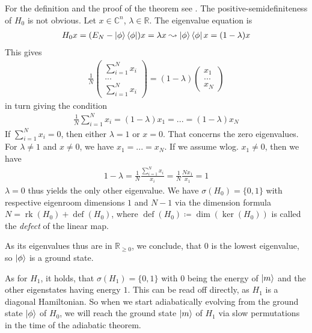 \documentclass[10pt]{amsart}
\theoremstyle{definition}
\theoremstyle{remark}
\DeclareMathOperator{\rk}{rk}
\DeclareMathOperator{\defect}{def}
\begin{document}
    For the definition and the proof of the theorem see \cite[pp. 86-91]{Lyche}. The positive-semidefiniteness of \(H_0\) is not obvious. Let \(x \in \mathbb{C}^n\), \(\lambda \in \mathbb{R}\). The eigenvalue equation is
    \begin{align}
        H_0x = (E_N-\ket{\phi}\bra{\phi})x = \lambda x \leadsto \ket{\phi}\bra{\phi}x = (1-\lambda)x
    \end{align}
    This gives
    \begin{align}
        \frac{1}{N} \begin{pmatrix}
            \sum_{i=1}^N x_i\\
            ...\\
            \sum_{i=1}^N x_i
        \end{pmatrix} = (1-\lambda) \begin{pmatrix}
            x_1\\
            ...\\
            x_N
        \end{pmatrix}
    \end{align}
    in turn giving the condition
    \begin{align}
        \frac{1}{N} \sum_{i=1}^N x_i = (1-\lambda) x_1 = ... = (1-\lambda) x_N
    \end{align}
    If \(\sum_{i=1}^N x_i = 0\), then either \(\lambda = 1\) or \(x = 0\). That concerns the zero eigenvalues. For \(\lambda \neq 1\) and \(x \neq 0\), we have \(x_1 = ... = x_N\). If we assume wlog. \(x_1 \neq 0\), then we have
    \begin{align}
        1-\lambda = \frac{1}{N} \frac{\sum_{i=1}^N x_i}{x_i} = \frac{1}{N} \frac{Nx_1}{x_1} = 1
    \end{align}
    \(\lambda = 0\) thus yields the only other eigenvalue. We have \(\sigma(H_0) = \{0, 1\}\) with respective eigenroom dimensions \(1\) and \(N-1\) via the dimension formula \(N = \rk(H_0) + \defect(H_0)\), where \(\defect(H_0) \coloneqq \dim(\ker(H_0))\) is called the \emph{defect} of the linear map.

    As its eigenvalues thus are in \(\mathbb{R}_{\geq 0}\), we conclude, that \(0\) is the lowest eigenvalue, so \(\ket{\phi}\) is a ground state.

    \phantom{}

    As for \(H_1\), it holds, that \(\sigma(H_1) = \{0, 1\}\) with \(0\) being the energy of \(\ket{m}\) and the other eigenstates having energy \(1\). This can be read off directly, as \(H_1\) is a diagonal Hamiltonian. So when we start adiabatically evolving from the ground state \(\ket{\phi}\) of \(H_0\), we will reach the ground state \(\ket{m}\) of \(H_1\) via slow permutations in the time of the adiabatic theorem.
\end{document}
